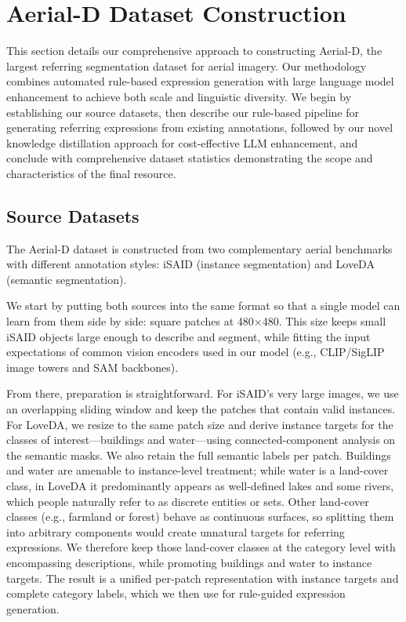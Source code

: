 
\section{Aerial-D Dataset Construction}
\label{sec:approach}

This section details our comprehensive approach to constructing Aerial-D, the largest referring segmentation dataset for aerial imagery. Our methodology combines automated rule-based expression generation with large language model enhancement to achieve both scale and linguistic diversity. We begin by establishing our source datasets, then describe our rule-based pipeline for generating referring expressions from existing annotations, followed by our novel knowledge distillation approach for cost-effective LLM enhancement, and conclude with comprehensive dataset statistics demonstrating the scope and characteristics of the final resource.

\subsection{Source Datasets}

The Aerial-D dataset is constructed from two complementary aerial benchmarks with different annotation styles: iSAID (instance segmentation) and LoveDA (semantic segmentation).

We start by putting both sources into the same format so that a single model can learn from them side by side: square patches at 480×480. This size keeps small iSAID objects large enough to describe and segment, while fitting the input expectations of common vision encoders used in our model (e.g., CLIP/SigLIP image towers and SAM backbones).

From there, preparation is straightforward. For iSAID’s very large images, we use an overlapping sliding window and keep the patches that contain valid instances. For LoveDA, we resize to the same patch size and derive instance targets for the classes of interest—buildings and water—using connected-component analysis on the semantic masks. We also retain the full semantic labels per patch. Buildings and water are amenable to instance-level treatment; while water is a land-cover class, in LoveDA it predominantly appears as well-defined lakes and some rivers, which people naturally refer to as discrete entities or sets. Other land-cover classes (e.g., farmland or forest) behave as continuous surfaces, so splitting them into arbitrary components would create unnatural targets for referring expressions. We therefore keep those land-cover classes at the category level with encompassing descriptions, while promoting buildings and water to instance targets. The result is a unified per-patch representation with instance targets and complete category labels, which we then use for rule-guided expression generation.

